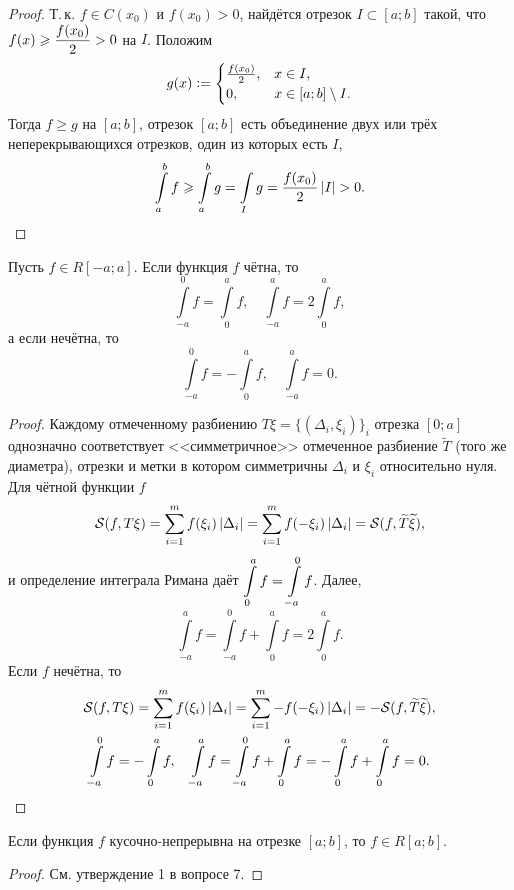 \begin{proof}
    Т.\,к. $f \in C(x_0)$ и $f(x_0) > 0$, найдётся отрезок $I \subset [a; b]$ такой, что $\displaystyle f(x) \geqslant \frac{f(x_0)}{2} > 0$ на $I$. Положим
    \[
        g(x) \vcentcolon =
        \begin{cases}
            \frac{f(x_0)}{2},& x \in I,\\
            0,& x \in [a; b] \setminus I.
        \end{cases}
    \]
    Тогда $f \geqslant g$ на $[a; b]$, отрезок $[a; b]$ есть объединение двух или трёх неперекрывающихся отрезков, один из которых есть $I$,
    \[
        \int\limits_a^bf \geqslant \int\limits_a^bg = \int\limits_Ig = \frac{f(x_0)}{2}\left\lvert I\right\rvert > 0.
    \]
\end{proof}

\begin{theorem}
    Пусть $f \in R[-a; a]$. Если функция $f$ чётна, то
    \[
        \int\limits_{-a}^0f = \int\limits_0^af,\quad\int\limits_{-a}^af = 2\int\limits_0^af,
    \]
    а если нечётна, то
    \[
        \int\limits_{-a}^0f = -\int\limits_0^af,\quad\int\limits_{-a}^af = 0.
    \]
\end{theorem}

\begin{proof}
    Каждому отмеченному разбиению  $T\xi = \{(\Delta_i, \xi_i)\}_i$ отрезка $[0; a]$ однозначно соответствует <<симметричное>> отмеченное разбиение $\widetilde{T}$ (того же диаметра), отрезки и метки в котором симметричны $\Delta_i$ и $\xi_i$ относительно нуля. Для чётной функции $f$
    \[
        \mathcal{S}(f, T\xi) = \sum_{i = 1}^mf(\xi_i)\left\lvert\Delta_i\right\rvert = \sum_{i = 1}^mf(-\xi_i)\left\lvert\Delta_i\right\rvert = \mathcal{S}(f, \widetilde{T}\widetilde{\xi}),
    \]
    и определение интеграла Римана даёт $\displaystyle\int\limits_0^af = \int\limits_{-a}^0f$. Далее,
    \[
        \int\limits_{-a}^af = \int\limits_{-a}^0f + \int\limits_0^af = 2\int\limits_0^af.
    \]
    Если $f$ нечётна, то
    \begin{gather*}
        \mathcal{S}(f, T\xi) = \sum_{i = 1}^mf(\xi_i)\left\lvert\Delta_i\right\rvert = \sum_{i = 1}^m-f(-\xi_i)\left\lvert\Delta_i\right\rvert = -\mathcal{S}(f, \widetilde{T}\widetilde{\xi}),\\
        \int\limits_{-a}^0f = -\int\limits_0^af,\quad\int\limits_{-a}^af = \int\limits_{-a}^0f + \int\limits_0^af = -\int\limits_0^af + \int\limits_0^af = 0.
    \end{gather*}
\end{proof}

\begin{theorem}
    Если функция $f$ кусочно-непрерывна на отрезке $[a; b]$, то $f \in R[a; b]$.
\end{theorem}

\begin{proof}
    См. утверждение 1 в вопросе 7.
\end{proof}

